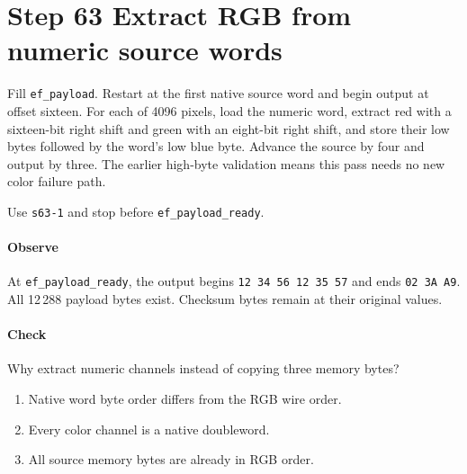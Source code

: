 \section{Step 63 Extract RGB from numeric source words}
Fill \texttt{ef\_payload}. Restart at the first native source word and begin output at offset sixteen. For each of 4096 pixels, load the numeric word, extract red with a sixteen-bit right shift and green with an eight-bit right shift, and store their low bytes followed by the word's low blue byte. Advance the source by four and output by three. The earlier high-byte validation means this pass needs no new color failure path.

Use \texttt{s63-1} and stop before \texttt{ef\_payload\_ready}.

\paragraph{Observe} At \texttt{ef\_payload\_ready}, the output begins \texttt{12 34 56 12 35 57} and ends \texttt{02 3A A9}. All 12\,288 payload bytes exist. Checksum bytes remain at their original values.

\paragraph{Check} Why extract numeric channels instead of copying three memory bytes?
\begin{enumerate}[label=\Alph*.]
\item Native word byte order differs from the RGB wire order.
\item Every color channel is a native doubleword.
\item All source memory bytes are already in RGB order.
\end{enumerate}
